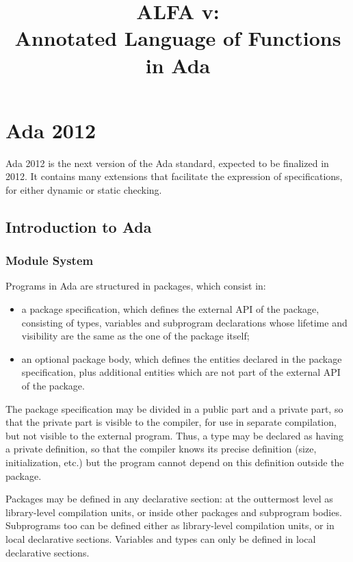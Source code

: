 \documentclass[fullpage]{article}
\title{ALFA v\version:\\Annotated Language of Functions in Ada}
\begin{document}
\maketitle
\sloppy

\setcounter{tocdepth}{2}
\tableofcontents

\section{Ada 2012}

Ada 2012 is the next version of the Ada standard, expected to be finalized in
2012. It contains many extensions that facilitate the expression of
specifications, for either dynamic or static checking.

\subsection{Introduction to Ada}

\subsubsection{Module System}

Programs in Ada are structured in packages, which consist in:
\begin{itemize}
\item a package specification, which defines the external API of the package,
  consisting of types, variables and subprogram declarations whose lifetime and
  visibility are the same as the one of the package itself;
\item an optional package body, which defines the entities declared in the
  package specification, plus additional entities which are not part of the
  external API of the package.
\end{itemize}

The package specification may be divided in a public part and a private part,
so that the private part is visible to the compiler, for use in separate
compilation, but not visible to the external program. Thus, a type may be
declared as having a private definition, so that the compiler knows its precise
definition (size, initialization, etc.) but the program cannot depend on this
definition outside the package.

Packages may be defined in any declarative section: at the outtermost level as
library-level compilation units, or inside other packages and subprogram
bodies. Subprograms too can be defined either as library-level compilation
units, or in local declarative sections. Variables and types can only be
defined in local declarative sections.
\end{document}
